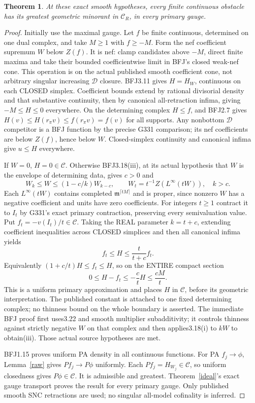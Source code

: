 \documentclass[11pt]{article}
\newtheorem{theorem}{Theorem}
\newcommand{\C}{\mathcal C}
\newcommand{\D}{\mathcal D}
\newcommand{\m}{\mathfrak m}
\begin{document}
\begin{theorem}\label{smooth}
At these exact smooth hypotheses, every finite continuous obstacle has its
greatest geometric minorant in $\C_R$, in every primary gauge.
\end{theorem}
\begin{proof}
Initially use the maximal gauge. Let $f$ be finite continuous, determined on
one dual complex, and take $M\ge1$ with $f\ge-M$. Form the nef coefficient
supremum $W$ below $Z(f)$. It is nef: clamp candidates above $-M$, direct
finite maxima and take their bounded coefficientwise limit in BFJ's closed
weak-nef cone. This operation is on the actual published smooth coefficient
cone, not arbitrary singular increasing $\D$ closure.
BFJ3.11 gives $H=H_W$, continuous on each CLOSED simplex. Coefficient bounds
extend by rational divisorial density and that substantive continuity, then
by canonical all-retraction infima, giving $-M\le H\le0$ everywhere.
On the determining complex $H\le f$, and BFJ2.7 gives
$H(v)\le H(r_\pi v)\le f(r_\pi v)=f(v)$ for all supports.
Any nonbottom $\D$ competitor is a BFJ function by the precise G331 comparison;
its nef coefficients are below $Z(f)$, hence below $W$.
Closed-simplex continuity and canonical infima give $u\le H$ everywhere.

If $W=0$, $H=0\in\C$. Otherwise BFJ3.18(iii), at its actual hypothesis that
$W$ is the envelope of determining data, gives $c>0$ and
\[
 W_k\le W\le(1-c/k)W_{k-c},\qquad
 W_t=t^{-1}Z(L^\infty(tW)),\quad k>c.
\]
Each $L^\infty(tW)$ contains completed $\m^{\lceil tM\rceil}$ and is proper,
since nonzero $W$ has a negative coefficient and units have zero coefficients.
For integers $t\ge1$ contract it to $I_t$ by G331's exact primary contraction,
preserving every semivaluation value. Put $f_t=-v(I_t)/t\in\C$.
Taking the REAL parameter $k=t+c$, extending coefficient inequalities across
CLOSED simplices and then all canonical infima yields
\[
 f_t\le H\le\frac{t}{t+c}f_t.
\]
Equivalently $(1+c/t)H\le f_t\le H$, so on the ENTIRE compact section
\[
 0\le H-f_t\le-\frac ct H\le\frac{cM}{t}.
\]
This is a uniform primary approximation and places $H$ in $\C$, before its
geometric interpretation. The published constant is attached to one fixed
determining complex; no thinness bound on the whole boundary is asserted.
The immediate BFJ proof first uses3.22 and smooth multiplier subadditivity;
it controls thinness against strictly negative $W$ on that complex and then
applies3.18(i) to $kW$ to obtain(iii). Those actual source hypotheses are met.

BFJ1.15 proves uniform PA density in all continuous functions. For PA
$f_j\to\phi$, Lemma~\ref{raw} gives $P f_j\to P\phi$ uniformly.
Each $P f_j=H_{W_j}\in\C$, so uniform closedness gives $P\phi\in\C$.
It is admissible and greatest. Theorem~\ref{ideal}'s exact gauge transport
proves the result for every primary gauge. Only published smooth SNC retractions
are used; no singular all-model cofinality is inferred.
\end{proof}
\end{document}
